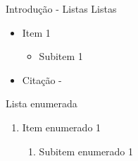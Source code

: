 \begin{frame}{Introdução - Listas}
    Listas
    \begin{itemize}
        \item Item 1
        \begin{itemize}
            \item Subitem 1
        \end{itemize}
        \item Citação - \cite{vasisht2016}
    \end{itemize}
    

    Lista enumerada
    \begin{enumerate}
        \item Item enumerado 1
        \begin{enumerate}
            \item Subitem enumerado 1
        \end{enumerate}
    \end{enumerate}
\end{frame}